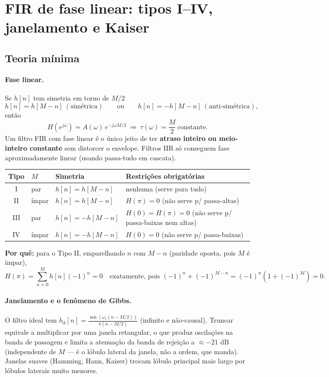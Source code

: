\section{FIR de fase linear: tipos I--IV, janelamento e Kaiser}\label{sec:fir}

\subsection*{Teoria mínima}

\paragraph{Fase linear.} Se $h[n]$ tem simetria em torno de $M/2$
\[
  h[n]=h[M-n]\ (\text{simétrica})\qquad\text{ou}\qquad
  h[n]=-h[M-n]\ (\text{anti-simétrica}),
\]
então
\[
  H(e^{j\omega})=A(\omega)\,e^{-j\omega M/2}
  \ \Rightarrow\ \tau(\omega)=\frac{M}{2}\ \text{constante} .
\]
Um filtro FIR com fase linear é o único jeito de ter \textbf{atraso inteiro ou
meio-inteiro constante} sem distorcer o envelope. Filtros IIR só conseguem
fase aproximadamente linear (usando passa-tudo em cascata).

\begin{center}
\begin{tabular}{clll}
\toprule
Tipo & $M$ & Simetria & Restrições obrigatórias\\
\midrule
I   & par    & $h[n]=h[M-n]$    & nenhuma (serve para tudo)\\
II  & ímpar & $h[n]=h[M-n]$    & $H(\pi)=0$ (não serve p/ passa-altas)\\
III & par    & $h[n]=-h[M-n]$   & $H(0)=H(\pi)=0$ (não serve p/ passa-baixas nem altas)\\
IV  & ímpar & $h[n]=-h[M-n]$   & $H(0)=0$ (não serve p/ passa-baixas)\\
\bottomrule
\end{tabular}
\end{center}

\textbf{Por quê:} para o Tipo II, emparelhando $n$ com $M-n$ (paridade oposta,
pois $M$ é ímpar),
\[
  H(\pi)=\sum_{n=0}^{M}h[n](-1)^{n}=0
  \quad\text{exatamente, pois }(-1)^{n}+(-1)^{M-n}=(-1)^n(1+(-1)^M)=0 .
\]

\paragraph{Janelamento e o fenômeno de Gibbs.} O filtro ideal tem
$h_d[n]=\frac{\operatorname{sen}(\omega_c(n-M/2))}{\pi(n-M/2)}$
(infinito e não-causal). Truncar equivale a multiplicar por uma janela
retangular, o que produz oscilações na banda de passagem e limita a atenuação
da banda de rejeição a $\approx-21$ dB (independente de $M$ — é o lóbulo
lateral da janela, não a ordem, que manda). Janelas suaves (Hamming, Hann,
Kaiser) trocam lóbulo principal mais largo por lóbulos laterais muito
menores.

